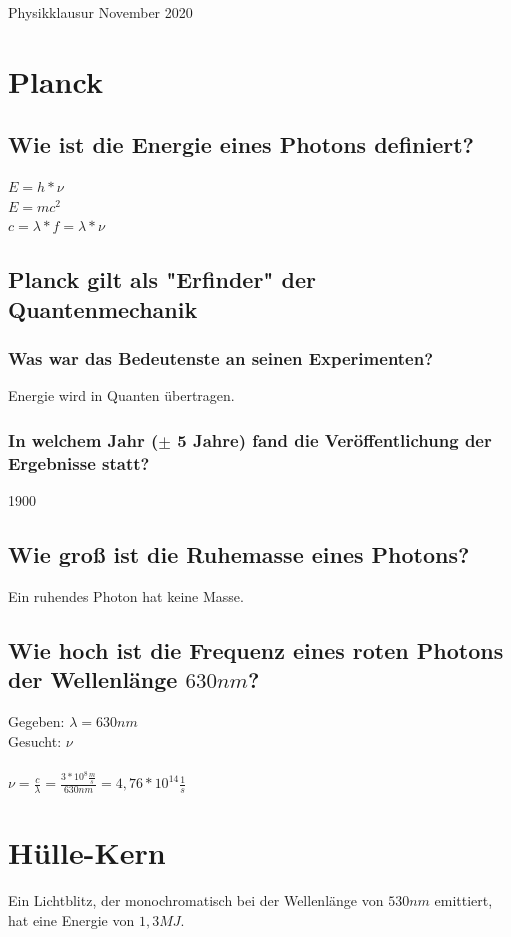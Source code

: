 \documentclass[12pt, a4paper]{article}
\begin{document}
\begin{center}
	\huge{Physikklausur November 2020}
\end{center}

\section{Planck}
\subsection{Wie ist die Energie eines Photons definiert?}
$E=h*\nu$\\
$E=mc^2$\\
$c=\lambda*f=\lambda*\nu$

\subsection{Planck gilt als "Erfinder" der Quantenmechanik}
\subsubsection{Was war das Bedeutenste an seinen Experimenten?}
Energie wird in Quanten übertragen.
\subsubsection{In welchem Jahr ($\pm$ 5 Jahre) fand die Veröffentlichung der Ergebnisse statt?}
1900

\subsection{Wie groß ist die Ruhemasse eines Photons?}
Ein ruhendes Photon hat keine Masse.

\subsection{Wie hoch ist die Frequenz eines roten Photons der Wellenlänge $630nm$?}
Gegeben: $\lambda=630nm$\\
Gesucht: $\nu$\\\\
$\nu=\frac{c}{\lambda}=\frac{3*10^8\frac{m}{s}}{630nm}=4,76*10^{14}\frac{1}{s}$

\newpage

\section{Hülle-Kern}
Ein Lichtblitz, der monochromatisch bei der Wellenlänge von $530nm$ emittiert, hat eine Energie von $1,3MJ$.
\end{document}
